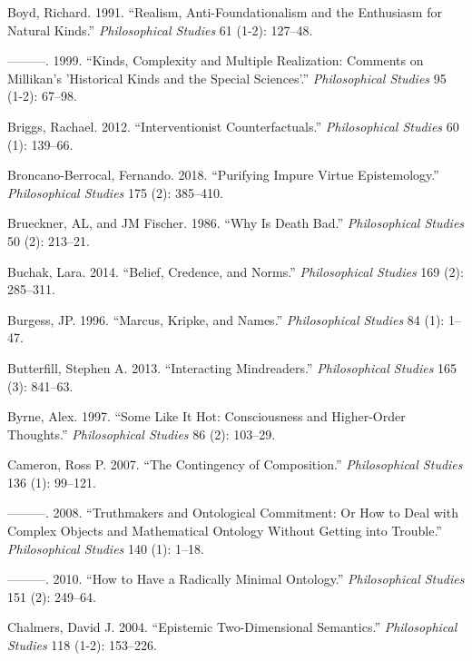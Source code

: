 \documentclass[
  10pt,
  letterpaper,
  DIV=11,
  numbers=noendperiod,
  twoside]{scrartcl}
\newlength{\cslhangindent}
\newenvironment{CSLReferences}[2] %
 {\begin{list}{}{%
  \setlength{\itemindent}{0pt}
  \setlength{\leftmargin}{0pt}
  \setlength{\parsep}{0pt}
  \ifodd #1
   \setlength{\leftmargin}{\cslhangindent}
   \setlength{\itemindent}{-1\cslhangindent}
  \fi
  \setlength{\itemsep}{#2\baselineskip}}}
 {\end{list}}
\begin{document}
\begin{CSLReferences}{1}{0}
Boyd, Richard. 1991. {``Realism, Anti-Foundationalism and the Enthusiasm
for Natural Kinds.''} \emph{Philosophical Studies} 61 (1-2): 127--48.

---------. 1999. {``Kinds, Complexity and Multiple Realization: Comments
on Millikan's 'Historical Kinds and the Special Sciences'.''}
\emph{Philosophical Studies} 95 (1-2): 67--98.

Briggs, Rachael. 2012. {``Interventionist Counterfactuals.''}
\emph{Philosophical Studies} 60 (1): 139--66.

Broncano-Berrocal, Fernando. 2018. {``Purifying Impure Virtue
Epistemology.''} \emph{Philosophical Studies} 175 (2): 385--410.

Brueckner, AL, and JM Fischer. 1986. {``Why Is Death Bad.''}
\emph{Philosophical Studies} 50 (2): 213--21.

Buchak, Lara. 2014. {``Belief, Credence, and Norms.''}
\emph{Philosophical Studies} 169 (2): 285--311.

Burgess, JP. 1996. {``Marcus, Kripke, and Names.''} \emph{Philosophical
Studies} 84 (1): 1--47.

Butterfill, Stephen A. 2013. {``Interacting Mindreaders.''}
\emph{Philosophical Studies} 165 (3): 841--63.

Byrne, Alex. 1997. {``Some Like It Hot: Consciousness and Higher-Order
Thoughts.''} \emph{Philosophical Studies} 86 (2): 103--29.

Cameron, Ross P. 2007. {``The Contingency of Composition.''}
\emph{Philosophical Studies} 136 (1): 99--121.

---------. 2008. {``Truthmakers and Ontological Commitment: Or How to
Deal with Complex Objects and Mathematical Ontology Without Getting into
Trouble.''} \emph{Philosophical Studies} 140 (1): 1--18.

---------. 2010. {``How to Have a Radically Minimal Ontology.''}
\emph{Philosophical Studies} 151 (2): 249--64.

Chalmers, David J. 2004. {``Epistemic Two-Dimensional Semantics.''}
\emph{Philosophical Studies} 118 (1-2): 153--226.


\end{CSLReferences}
\end{document}
